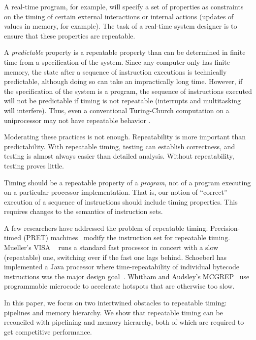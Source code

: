 A real-time program, for example, will specify a set of properties
as constraints on the timing of certain external interactions or
internal actions (updates of values in memory, for example).
The task of a real-time system designer is to ensure that these
properties are repeatable.

A \emph{predictable} property is a repeatable property than can be
determined in finite time from a specification of the system.
Since any computer only has
finite memory, the state after a sequence of instruction executions is technically
predictable, although doing so can take an impractically long time.
However, if the specification of the system is a program, the sequence
of instructions executed will not be predictable if timing
is not repeatable (interrupts and multitasking will interfere).
Thus, even a conventional Turing-Church computation on
a uniprocessor may not
have repeatable behavior \cite{Lee:06:Threads}.



Moderating these practices is not enough.  Repeatability is more
important than predictability.  With repeatable timing, testing can
establish correctness, and testing is almost always easier than
detailed analysis.  Without repeatability, testing proves little.

Timing should be a repeatable property of a \textit{program}, not
of a program executing on a particular processor implementation.
That is, our notion of ``correct'' execution of a sequence
of instructions should include timing
properties. This requires changes to the semantics of instruction sets.

A few researchers have addressed the problem of repeatable
timing.
Precision-timed (PRET)
machines~\cite{LeeEdwards:07:PRET,pret:cases:2008} modify
the instruction set for repeatable timing.
Mueller's VISA ~\cite{meuller:03:visa} runs a standard fast
processor in concert with a slow (repeatable) one, switching
over if the fast one lags behind.
Schoeberl has implemented a Java processor where time-repeatability
of individual bytecode instructions was the major design
goal~\cite{jop:jnl:jsa2007}. Whitham and Audsley's
MCGREP~\cite{whitam:06:mcgrep} use
programmable microcode to accelerate hotspots that are otherwise too
slow.

In this paper, we focus on two intertwined obstacles to
repeatable timing:
pipelines and memory hierarchy. We show that repeatable
timing can be reconciled with pipelining and memory hierarchy,
both of which are required to get competitive performance.


